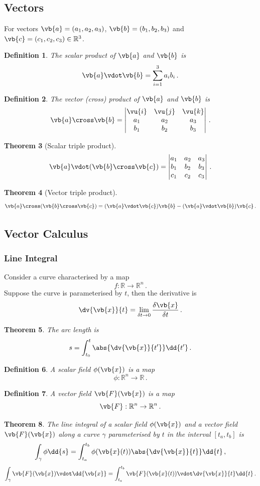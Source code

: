 \documentclass{article}
\theoremstyle{plain}\theoremheaderfont{\normalfont\itshape}\theorembodyfont{\rmfamily}\theoremseparator{.}\newtheorem*{rem}{Remark}\newtheorem*{ex}{Example}\newtheorem*{proof}{Proof}\newtheorem*{altp}{Alternative proof}
\theoremstyle{plain}\theoremheaderfont{\normalfont\bfseries}\theorembodyfont{\rmfamily}\theoremseparator{.}\newtheorem{thm}{Theorem}[section]\newtheorem{lem}[thm]{Lemma}\newtheorem{prop}[thm]{Proposition}\newtheorem*{cor}{Corollary}\newtheorem{defn}[thm]{Definition}\newtheorem{clm}[thm]{Claim}\newtheorem{clminproof}{Claim}
\theoremstyle{break}\theoremheaderfont{\normalfont\itshape}\theorembodyfont{\rmfamily}\theoremseparator{.\medskip}\newtheorem*{proofskip}{Proof}\newtheorem*{exs}{Examples}\newtheorem*{rems}{Remarks}
\theoremstyle{break}\theoremheaderfont{\normalfont\bfseries}\theorembodyfont{\rmfamily}\theoremseparator{.\medskip}\newtheorem{lemskip}[thm]{Lemma}\newtheorem{defnskip}[thm]{Definition}\newtheorem{propskip}[thm]{Proposition}\newtheorem{thmskip}[thm]{Theorem}
\numberwithin{equation}{section}
\begin{document}
	\subsection{Vectors}
	For vectors \(\vb{a}=(a_1,a_2,a_3)\), \(\vb{b}=(b_1,b_2,b_3)\) and \(\vb{c}=(c_1,c_2,c_3)\in\mathbb{R}^3\).
	\begin{defn}
		The \textit{scalar product} of \(\vb{a}\) and \(\vb{b}\) is
		\[\vb{a}\vdot\vb{b}=\sum_{i=1}^{3}a_ib_i\,.\]
	\end{defn}
	\begin{defn}
		The \textit{vector (cross) product} of \(\vb{a}\) and \(\vb{b}\) is
		\[\vb{a}\cross\vb{b}=\begin{vmatrix}
			\vu{i} & \vu{j} & \vu{k}\\
			a_1 & a_2 & a_3\\
			b_1 & b_2 & b_3
		\end{vmatrix}\,.\]
	\end{defn}
	\begin{thm}[Scalar triple product]
		\[\vb{a}\vdot(\vb{b}\cross\vb{c})=\begin{vmatrix}
			a_1 & a_2 & a_3\\
			b_1 & b_2 & b_3\\
			c_1 & c_2 & c_3
		\end{vmatrix}\,.\]
	\end{thm}
	\begin{thm}[Vector triple product]
		\[\vb{a}\cross(\vb{b}\cross\vb{c})=(\vb{a}\vdot\vb{c})\vb{b}-(\vb{a}\vdot\vb{b})\vb{c}\,.\]
	\end{thm}
	\subsection{Vector Calculus}
	\subsubsection{Line Integral}
	Consider a curve characterised by a map
	\[f:\mathbb{R}\to\mathbb{R}^n\,.\]
	Suppose the curve is parameterised by \(t\), then the derivative is
	\[\dv{\vb{x}}{t}=\lim_{\delta t\to 0}\frac{\delta\vb{x}}{\delta t}\,.\]
	\begin{thm}
		The arc length is
		\[s=\int_{t_0}^{t}\abs{\dv{\vb{x}}{t'}}\dd{t'}\,.\]
	\end{thm}
	\begin{defn}
		A \textit{scalar field} \(\phi(\vb{x})\) is a map
		\[\phi:\mathbb{R}^n\to\mathbb{R}\,.\]
	\end{defn}
	\begin{defn}
		A \textit{vector field} \(\vb{F}(\vb{x})\) is a map
		\[\vb{F}:\mathbb{R}^n\to\mathbb{R}^n\,.\]
	\end{defn}
	\begin{thm}
		The line integral of a scalar field \(\phi(\vb{x})\) and a vector field \(\vb{F}(\vb{x})\) along a curve \(\gamma\) parameterised by \(t\) in the interval \([t_a,t_b]\) is
		\[\int_\mathcal{\gamma}\phi\dd{s}=\int_{t_a}^{t_b}\phi(\vb{x}(t))\abs{\dv{\vb{x}}{t}}\dd{t}\,,\]
		\[\int_\mathcal{\gamma}\vb{F}(\vb{x})\vdot\dd{\vb{x}}=\int_{t_a}^{t_b}\vb{F}(\vb{x}(t))\vdot\dv{\vb{x}}{t}\dd{t}\,.\]
	\end{thm}
\end{document}
